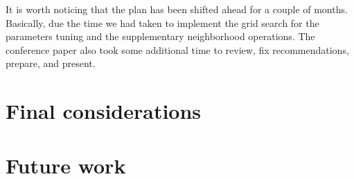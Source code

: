 It is worth noticing that the plan has been shifted ahead for a couple of months. Basically, due the time we had taken to implement the grid search for the parameters tuning and the supplementary neighborhood operations. The conference paper also took some additional time to review, fix recommendations, prepare, and present.


\section{Final considerations}
\label{sec:final_considerations}

\section{Future work}
\label{sec:future_work}